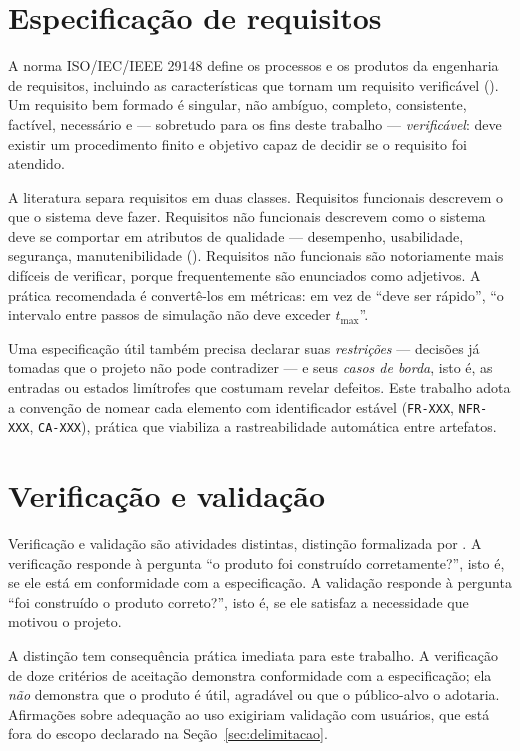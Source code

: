 \section{Especificação de requisitos}
\label{sec:requisitos}

A norma ISO/IEC/IEEE 29148 define os processos e os produtos da engenharia de
requisitos, incluindo as características que tornam um requisito verificável
(). Um requisito bem formado é singular, não ambíguo,
completo, consistente, factível, necessário e --- sobretudo para os fins deste
trabalho --- \emph{verificável}: deve existir um procedimento finito e objetivo
capaz de decidir se o requisito foi atendido.

A literatura separa requisitos em duas classes. Requisitos funcionais descrevem o
que o sistema deve fazer. Requisitos não funcionais descrevem como o sistema deve
se comportar em atributos de qualidade --- desempenho, usabilidade, segurança,
manutenibilidade (). Requisitos não funcionais são
notoriamente mais difíceis de verificar, porque frequentemente são enunciados
como adjetivos. A prática recomendada é convertê-los em métricas: em vez de
``deve ser rápido'', ``o intervalo entre passos de simulação não deve exceder
$t_{\max}$''.

Uma especificação útil também precisa declarar suas \emph{restrições} ---
decisões já tomadas que o projeto não pode contradizer --- e seus \emph{casos de
borda}, isto é, as entradas ou estados limítrofes que costumam revelar defeitos.
Este trabalho adota a convenção de nomear cada elemento com identificador estável
(\texttt{FR-XXX}, \texttt{NFR-XXX}, \texttt{CA-XXX}), prática que viabiliza a
rastreabilidade automática entre artefatos.

\section{Verificação e validação}
\label{sec:vv}

Verificação e validação são atividades distintas, distinção formalizada por
. A verificação responde à pergunta ``o produto foi
construído corretamente?'', isto é, se ele está em conformidade com a
especificação. A validação responde à pergunta ``foi construído o produto
correto?'', isto é, se ele satisfaz a necessidade que motivou o projeto.

A distinção tem consequência prática imediata para este trabalho. A verificação
de doze critérios de aceitação demonstra conformidade com a especificação; ela
\emph{não} demonstra que o produto é útil, agradável ou que o público-alvo o
adotaria. Afirmações sobre adequação ao uso exigiriam validação com usuários, que
está fora do escopo declarado na Seção~\ref{sec:delimitacao}.

